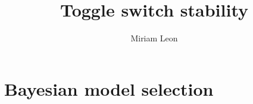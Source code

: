 \documentclass[]{chapter_only}
\title{Toggle switch stability}
\author{Miriam Leon}
\begin{document}

\tableofcontents*
{}


\mainmatter*
\chapter{Bayesian model selection}





\printbibliography
\end{document}
